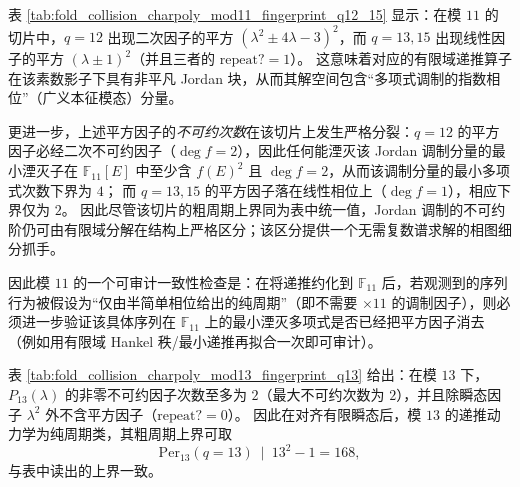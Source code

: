 \begin{remark}[平方因子 \texorpdfstring{$\Rightarrow$}{=>} 多项式调制：模 \texorpdfstring{$11$}{11} 的递推审计抓手]\label{rem:pom-charpoly-mod11-modulation}
表 \ref{tab:fold_collision_charpoly_mod11_fingerprint_q12_15} 显示：在模 \(11\) 的切片中，\(q=12\) 出现二次因子的平方 \((\lambda^2\pm 4\lambda-3)^2\)，而 \(q=13,15\) 出现线性因子的平方 \((\lambda\pm 1)^2\)（并且三者的 \(\mathrm{repeat?}=1\)）。
这意味着对应的有限域递推算子在该素数影子下具有非平凡 Jordan 块，从而其解空间包含“多项式调制的指数相位”（广义本征模态）分量。
\par
更进一步，上述平方因子的\emph{不可约次数}在该切片上发生严格分裂：\(q=12\) 的平方因子必经二次不可约因子（\(\deg f=2\)），因此任何能湮灭该 Jordan 调制分量的最小湮灭子在 \(\mathbb{F}_{11}[E]\) 中至少含 \(f(E)^2\) 且 \(\deg f=2\)，从而该调制分量的最小多项式次数下界为 \(4\)；
而 \(q=13,15\) 的平方因子落在线性相位上（\(\deg f=1\)），相应下界仅为 \(2\)。
因此尽管该切片的粗周期上界同为表中统一值，Jordan 调制的不可约阶仍可由有限域分解在结构上严格区分；该区分提供一个无需复数谱求解的相图细分抓手。
\par
因此模 \(11\) 的一个可审计一致性检查是：在将递推约化到 \(\mathbb{F}_{11}\) 后，若观测到的序列行为被假设为“仅由半简单相位给出的纯周期”（即不需要 \(\times 11\) 的调制因子），则必须进一步验证该具体序列在 \(\mathbb{F}_{11}\) 上的最小湮灭多项式是否已经把平方因子消去（例如用有限域 Hankel 秩/最小递推再拟合一次即可审计）。
\end{remark}

\begin{remark}[模 \texorpdfstring{$13$}{13} 的低复杂度指纹：\texorpdfstring{$q=13$}{q=13} 的纯周期上界]\label{rem:pom-charpoly-mod13-small-period}
表 \ref{tab:fold_collision_charpoly_mod13_fingerprint_q13} 给出：在模 \(13\) 下，\(P_{13}(\lambda)\) 的非零不可约因子次数至多为 \(2\)（最大不可约次数为 \(2\)），并且除瞬态因子 \(\lambda^2\) 外不含平方因子（\(\mathrm{repeat?}=0\)）。
因此在对齐有限瞬态后，模 \(13\) 的递推动力学为纯周期类，其粗周期上界可取
\[
\mathrm{Per}_{13}(q=13)\ \mid\ 13^2-1=168,
\]
与表中读出的上界一致。
\end{remark}

